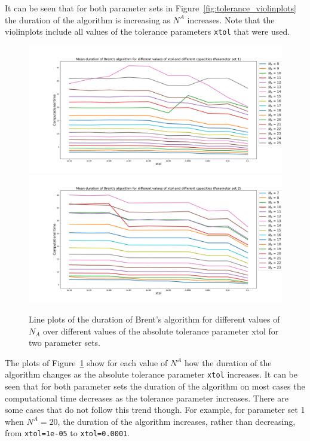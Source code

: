 It can be seen that for both parameter sets in
Figure~\ref{fig:tolerance_violinplots} the duration of the algorithm is
increasing as \(N^A\) increases.
Note that the violinplots include all values of the tolerance parameters
\lstinline[style=pystyle]{xtol} that were used.

\begin{figure}[H]
    \centering
    \includegraphics[width=\textwidth]{chapters/04_game_theoretic_model/Bin/brents_method/tolerance/tolerance_lineplots_1.pdf}
    \includegraphics[width=\textwidth]{chapters/04_game_theoretic_model/Bin/brents_method/tolerance/tolerance_lineplots_2.pdf}
    \caption{
        Line plots of the duration of Brent's algorithm for different values of
        \(N_A\) over different values of the absolute tolerance parameter xtol
        for two parameter sets.
    }
    \label{fig:tolerance_lineplots}
\end{figure}

The plots of Figure~\ref{fig:tolerance_lineplots} show for each value of \(N^A\)
how the duration of the algorithm changes as the absolute tolerance parameter
\lstinline[style=pystyle]{xtol} increases.
It can be seen that for both parameter sets the duration of the algorithm
on most cases the computational time decreases as the tolerance parameter
increases.
There are some cases that do not follow this trend though.
For example, for parameter set 1 when \(N^A=20\), the duration of the algorithm
increases, rather than decreasing, from \lstinline[style=pystyle]{xtol=1e-05}
to \lstinline[style=pystyle]{xtol=0.0001}.




